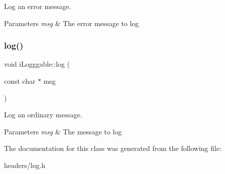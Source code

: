 Log an error message. 


\begin{DoxyParams}{Parameters}
{\em msg} & The error message to log \\
\hline
\end{DoxyParams}
\mbox{\label{classi_logggable_abd81f07c9bacd1d223f6bf8d50c02e64}} 
\subsubsection{log()}
{\footnotesize\ttfamily void i\+Logggable\+::log (\begin{DoxyParamCaption}\item[{const char $\ast$}]{msg }\end{DoxyParamCaption})\hspace{0.3cm}{\ttfamily [inline]}}



Log an ordinary message. 


\begin{DoxyParams}{Parameters}
{\em msg} & The message to log \\
\hline
\end{DoxyParams}


The documentation for this class was generated from the following file\+:\begin{DoxyCompactItemize}
\item 
headers/log.\+h\end{DoxyCompactItemize}
